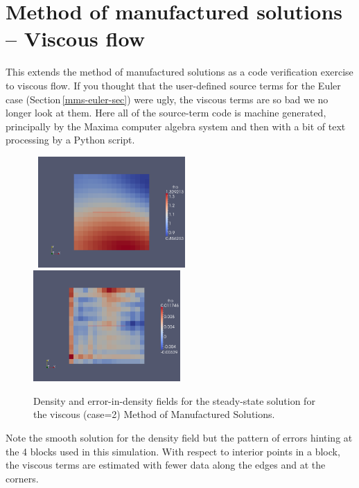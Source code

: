
\section{Method of manufactured solutions -- Viscous flow}
\label{mms-viscous-sec}
%
This extends the method of manufactured solutions 
as a code verification exercise to viscous flow.
If you thought that the user-defined source terms for 
the Euler case (Section\,\ref{mms-euler-sec}) were ugly,
the viscous terms are so bad we no longer look at them.
Here all of the source-term code is machine generated, 
principally by the Maxima computer algebra system and then 
with a bit of text processing by a Python script.

\begin{figure}[htbp]
\begin{center}
\mbox{
\includegraphics[width=0.5\textwidth]{../2D/mms/density-field-at-80ms.png}
\includegraphics[width=0.5\textwidth]{../2D/mms/density-error-at-80ms.png}
}
\end{center}
\caption{Density and error-in-density fields for the steady-state solution for the
  viscous (case=2) Method of Manufactured Solutions.}
\label{mms-viscous-density-error-fig}
\end{figure}

\noindent
Note the smooth solution for the density field but the pattern of errors hinting
at the 4 blocks used in this simulation.
With respect to interior points in a block, the viscous terms are estimated 
with fewer data along the edges and at the corners.


